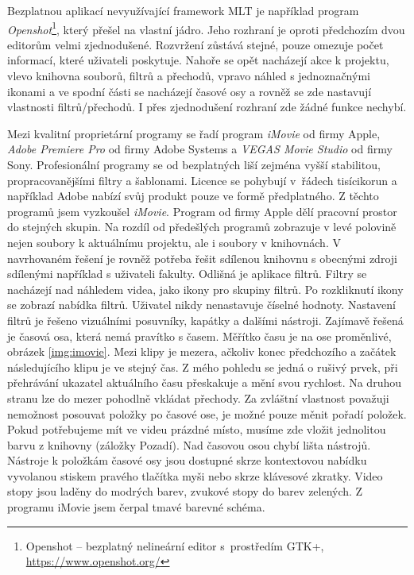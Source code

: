 Bezplatnou aplikací nevyužívající framework MLT je například program \textit{Openshot}\footnote{Openshot -- bezplatný nelineární editor s~prostředím GTK+, \url{https://www.openshot.org/}}, který přešel na vlastní jádro. Jeho rozhraní je oproti předchozím dvou editorům velmi zjednodušené. Rozvržení zůstává stejné, pouze omezuje počet informací, které uživateli poskytuje. Nahoře se opět nacházejí akce k projektu, vlevo knihovna souborů, filtrů a přechodů, vpravo náhled s jednoznačnými ikonami a ve spodní části se nacházejí časové osy a rovněž se zde nastavují vlastnosti filtrů/přechodů. I přes zjednodušení rozhraní zde žádné funkce nechybí.

Mezi kvalitní proprietární programy se řadí program \textit{iMovie} od firmy Apple, \textit{Adobe Premiere Pro} od firmy Adobe Systems a \textit{VEGAS Movie Studio} od firmy Sony. Profesionální programy se od bezplatných liší zejména vyšší stabilitou, propracovanějšími filtry a šablonami. Licence se pohybují v~řádech tisícikorun a například Adobe nabízí svůj produkt pouze ve formě předplatného. Z těchto programů jsem vyzkoušel \textit{iMovie}. Program od firmy Apple dělí pracovní prostor do stejných skupin. Na rozdíl od předešlých programů zobrazuje v levé polovině nejen soubory k aktuálnímu projektu, ale i soubory v knihovnách. V navrhovaném řešení je rovněž potřeba řešit sdílenou knihovnu s obecnými zdroji sdílenými například s uživateli fakulty. Odlišná je aplikace filtrů. Filtry se nacházejí nad náhledem videa, jako ikony pro skupiny filtrů. Po rozkliknutí ikony se zobrazí nabídka filtrů. Uživatel nikdy nenastavuje číselné hodnoty. Nastavení filtrů je řešeno vizuálními posuvníky, kapátky a dalšími nástroji. Zajímavě řešená je časová osa, která nemá pravítko s časem. Měřítko času je na ose proměnlivé, obrázek \ref{img:imovie}. Mezi klipy je mezera, ačkoliv konec předchozího a začátek následujícího klipu je ve stejný čas. Z mého pohledu se jedná o rušivý prvek, při přehrávání ukazatel aktuálního času přeskakuje a mění svou rychlost. Na druhou stranu lze do mezer pohodlně vkládat přechody. Za zvláštní vlastnost považuji nemožnost posouvat položky po časové ose, je možné pouze měnit pořadí položek. Pokud potřebujeme mít ve videu prázdné místo, musíme zde vložit jednolitou barvu z knihovny (záložky Pozadí). Nad časovou osou chybí lišta nástrojů. Nástroje k položkám časové osy jsou dostupné skrze kontextovou nabídku vyvolanou stiskem pravého tlačítka myši nebo skrze klávesové zkratky. Video stopy jsou laděny do modrých barev, zvukové stopy do barev zelených. Z programu iMovie jsem čerpal tmavé barevné schéma.
